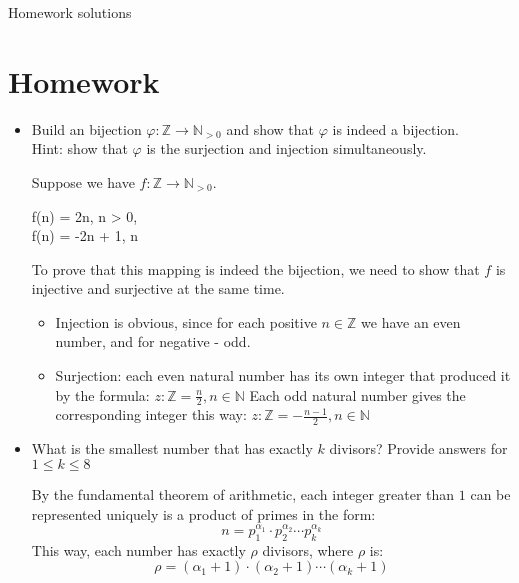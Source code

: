 \documentclass{beamer}
\begin{document}
\begin{frame}[allowframebreaks]{Homework solutions}
    \section{Homework}
    \begin{itemize}
        \item Build an bijection $\varphi : \mathbb{Z} \to \mathbb{N}_{>0}$ and 
        show that $\varphi$ is indeed a bijection. \\ 
        Hint: show that $\varphi$ is the surjection and injection simultaneously.
		\newpage
        \begin{solution}
			Suppose we have $f : \mathbb{Z} \to \mathbb{N}_{>0}$.
			\begin{flalign*}
				\begin{cases}
					f(n) = 2n, \quad n > 0,\\
					f(n) = -2n + 1, \quad n 
				\end{cases}
			\end{flalign*}
		To prove that this mapping is indeed the bijection, we need to show 
		that $f$ is injective and surjective at the same time. \\
		\begin{itemize}
			\item Injection is obvious, since for each positive $n \in \mathbb{Z}$
			we have an even number, and for negative - odd.
			\item Surjection: each even natural number has its own integer that 
			produced it by the formula: $z: \mathbb{Z} = \frac{n}{2}, n \in \mathbb{N}$
			Each odd natural number gives the corresponding integer this way:
			$z: \mathbb{Z} = -\frac{n - 1}{2}, n \in \mathbb{N}$
		\end{itemize}
		\end{solution}
		
		\item What is the smallest number that has exactly $k$ divisors?
        Provide answers for $1 \le k \le 8$

		\begin{solution}[Outline]
			By the fundamental theorem of arithmetic, each integer greater than 
			$1$ can be represented uniquely is a product of primes in the form:
			\begin{equation}
				n = p_1^{\alpha_1} \cdot p_2^{\alpha_2} \cdots p_k^{\alpha_k}
			\end{equation}
			This way, each number has exactly $\rho$ divisors, where $\rho$ is:
			\begin{equation}
				\rho = (\alpha_1 + 1) \cdot (\alpha_2 + 1) \cdots (\alpha_k + 1)
			\end{equation}
		\end{solution}
    \end{itemize}
\end{frame}
\end{document}
